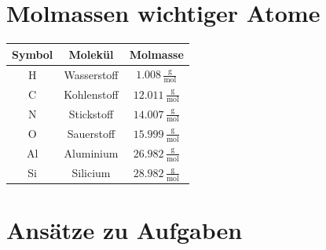 \section{Molmassen wichtiger Atome}

\begin{tabular}{c | c | c }
\textbf{Symbol} & \textbf{Molekül} & \textbf{Molmasse} \\
\hline
\rule{0pt}{10pt} H & Wasserstoff & $1.008 \, \mathrm{\frac{g}{mol}}$ \\
\rule{0pt}{10pt} C & Kohlenstoff & $12.011 \, \mathrm{\frac{g}{mol}}$ \\
\rule{0pt}{10pt} N & Stickstoff & $14.007 \, \mathrm{\frac{g}{mol}}$ \\
\rule{0pt}{10pt} O & Sauerstoff & $15.999 \, \mathrm{\frac{g}{mol}}$ \\
\rule{0pt}{10pt} Al & Aluminium & $26.982 \, \mathrm{\frac{g}{mol}}$ \\
\rule{0pt}{10pt} Si & Silicium & $28.982 \, \mathrm{\frac{g}{mol}}$ \\
\end{tabular}

\vfill\null
\columnbreak



\section{Ansätze zu Aufgaben}

